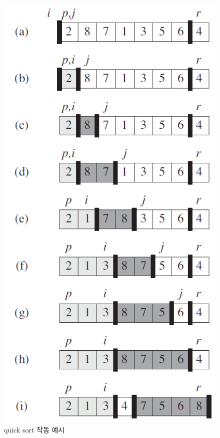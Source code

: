 \begin{figure}[h!]
    \centering
    \includegraphics[scale=0.7]{pic/q1.png}
    \caption{quick sort 작동 예시\cite{reference1}}
\end{figure}


%
\newpage
